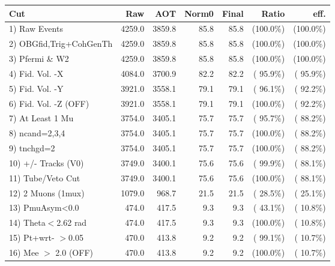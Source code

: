  \begin{table}[h!]\centering
 \begin{tabular}{||l||r|r|r|r|r|r||}
 \hline
 \hline
 Cut & Raw & AOT & Norm0 & Final & Ratio & eff.       \\
 \hline
  1) Raw Events           &       4259.0 &       3859.8 &         85.8 &         85.8 & (100.0\%) & (100.0\%) \\
  2) OBGfid,Trig+CohGenTh &       4259.0 &       3859.8 &         85.8 &         85.8 & (100.0\%) & (100.0\%) \\
  3) Pfermi \& W2         &       4259.0 &       3859.8 &         85.8 &         85.8 & (100.0\%) & (100.0\%) \\
  4) Fid. Vol. -X         &       4084.0 &       3700.9 &         82.2 &         82.2 & ( 95.9\%) & ( 95.9\%) \\
  5) Fid. Vol. -Y         &       3921.0 &       3558.1 &         79.1 &         79.1 & ( 96.1\%) & ( 92.2\%) \\
  6) Fid. Vol. -Z (OFF)   &       3921.0 &       3558.1 &         79.1 &         79.1 & (100.0\%) & ( 92.2\%) \\
  7) At Least 1 Mu        &       3754.0 &       3405.1 &         75.7 &         75.7 & ( 95.7\%) & ( 88.2\%) \\
  8) ncand=2,3,4          &       3754.0 &       3405.1 &         75.7 &         75.7 & (100.0\%) & ( 88.2\%) \\
  9) tnchgd=2             &       3754.0 &       3405.1 &         75.7 &         75.7 & (100.0\%) & ( 88.2\%) \\
 10) +/- Tracks (V0)      &       3749.0 &       3400.1 &         75.6 &         75.6 & ( 99.9\%) & ( 88.1\%) \\
 11) Tube/Veto Cut        &       3749.0 &       3400.1 &         75.6 &         75.6 & (100.0\%) & ( 88.1\%) \\
 12) 2 Muons (1mux)       &       1079.0 &        968.7 &         21.5 &         21.5 & ( 28.5\%) & ( 25.1\%) \\
 13) PmuAsym<0.0          &        474.0 &        417.5 &          9.3 &          9.3 & ( 43.1\%) & ( 10.8\%) \\
 14) Theta$<$2.62 rad     &        474.0 &        417.5 &          9.3 &          9.3 & (100.0\%) & ( 10.8\%) \\
 15) Pt+wrt- $>$0.05      &        470.0 &        413.8 &          9.2 &          9.2 & ( 99.1\%) & ( 10.7\%) \\
 16) Mee $>$ 2.0  (OFF)   &        470.0 &        413.8 &          9.2 &          9.2 & (100.0\%) & ( 10.7\%) \\

\end{tabular}
\end{table}
